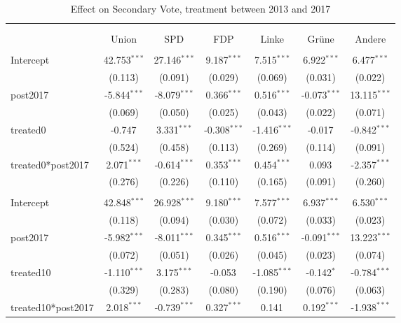 \documentclass[12pt]{article}
\begin{document}
 
\begin{table}[!htbp] \centering
  \caption{Effect on Secondary Vote, treatment between 2013 and 2017}
\begin{tabular}{@{\extracolsep{5pt}}lcccccc}
\\[-1.8ex]\hline
\hline \\[-1.8ex]
\\[-1.8ex] & \multicolumn{1}{c}{Union} & \multicolumn{1}{c}{SPD} & \multicolumn{1}{c}{FDP} & \multicolumn{1}{c}{Linke} & \multicolumn{1}{c}{Grüne} & \multicolumn{1}{c}{Andere}  \\
\hline \\[-1.8ex]
 Intercept & 42.753$^{***}$ & 27.146$^{***}$ & 9.187$^{***}$ & 7.515$^{***}$ & 6.922$^{***}$ & 6.477$^{***}$ \\
  & (0.113) & (0.091) & (0.029) & (0.069) & (0.031) & (0.022) \\
 post2017 & -5.844$^{***}$ & -8.079$^{***}$ & 0.366$^{***}$ & 0.516$^{***}$ & -0.073$^{***}$ & 13.115$^{***}$ \\
  & (0.069) & (0.050) & (0.025) & (0.043) & (0.022) & (0.071) \\
 treated0 & -0.747$^{}$ & 3.331$^{***}$ & -0.308$^{***}$ & -1.416$^{***}$ & -0.017$^{}$ & -0.842$^{***}$ \\
  & (0.524) & (0.458) & (0.113) & (0.269) & (0.114) & (0.091) \\
 treated0*post2017 & 2.071$^{***}$ & -0.614$^{***}$ & 0.353$^{***}$ & 0.454$^{***}$ & 0.093$^{}$ & -2.357$^{***}$ \\
  & (0.276) & (0.226) & (0.110) & (0.165) & (0.091) & (0.260) \\
\hline \\[-1.8ex]
 Intercept & 42.848$^{***}$ & 26.928$^{***}$ & 9.180$^{***}$ & 7.577$^{***}$ & 6.937$^{***}$ & 6.530$^{***}$ \\
  & (0.118) & (0.094) & (0.030) & (0.072) & (0.033) & (0.023) \\
 post2017 & -5.982$^{***}$ & -8.011$^{***}$ & 0.345$^{***}$ & 0.516$^{***}$ & -0.091$^{***}$ & 13.223$^{***}$ \\
  & (0.072) & (0.051) & (0.026) & (0.045) & (0.023) & (0.074) \\
 treated10 & -1.110$^{***}$ & 3.175$^{***}$ & -0.053$^{}$ & -1.085$^{***}$ & -0.142$^{*}$ & -0.784$^{***}$ \\
  & (0.329) & (0.283) & (0.080) & (0.190) & (0.076) & (0.063) \\
 treated10*post2017 & 2.018$^{***}$ & -0.739$^{***}$ & 0.327$^{***}$ & 0.141$^{}$ & 0.192$^{***}$ & -1.938$^{***}$ \\

\end{tabular}
\end{table}
\end{document}
